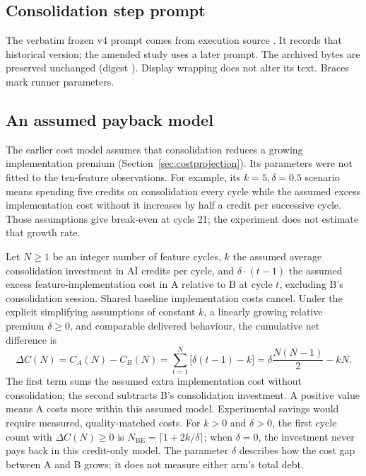 \subsection{Consolidation step prompt}\label{app:prompt}

The verbatim frozen v4 prompt comes from execution source .
It records that historical version; the amended study uses a later prompt.
The archived bytes are preserved unchanged
(digest ).
Display wrapping does not alter its text. Braces mark runner parameters.



\FloatBarrier
\subsection{An assumed payback model}\label{app:economics}

The earlier cost model assumes that consolidation reduces a growing
implementation premium (Section~\ref{sec:costprojection}). Its parameters
were not fitted to the ten-feature observations. For example, its
$k=5,\delta=0.5$ scenario means spending five credits on consolidation
every cycle while the assumed excess implementation cost without it
increases by half a credit per successive cycle. Those assumptions give
break-even at cycle 21; the experiment does not estimate that growth rate.

Let $N\geq1$ be an integer number of feature cycles, $k$ the assumed average consolidation
investment in AI credits per cycle, and $\delta\cdot(t-1)$ the assumed excess
feature-implementation cost in A relative to B at cycle $t$, excluding
B's consolidation session. Shared baseline implementation costs cancel.
Under the explicit simplifying assumptions of constant $k$, a linearly
growing relative premium $\delta\geq0$, and comparable delivered behaviour,
the cumulative net difference is
\begin{equation}
\Delta C(N)=C_A(N)-C_B(N)
=\sum_{t=1}^{N}\bigl[\delta(t-1)-k\bigr]
=\delta\frac{N(N-1)}{2}-kN.
\label{eq:costprojection}
\end{equation}
The first term sums the assumed extra implementation cost without
consolidation; the second subtracts B's consolidation investment.
A positive value means A costs more within this assumed model.
Experimental savings would require measured, quality-matched costs.
For $k>0$ and $\delta>0$, the first cycle count with $\Delta C(N)\geq0$ is
$N_{\mathrm{BE}}=\lceil1+2k/\delta\rceil$; when $\delta=0$, the investment never pays back in
this credit-only model.
The parameter $\delta$ describes how the cost gap between A and B grows;
it does not measure either arm's total debt.

